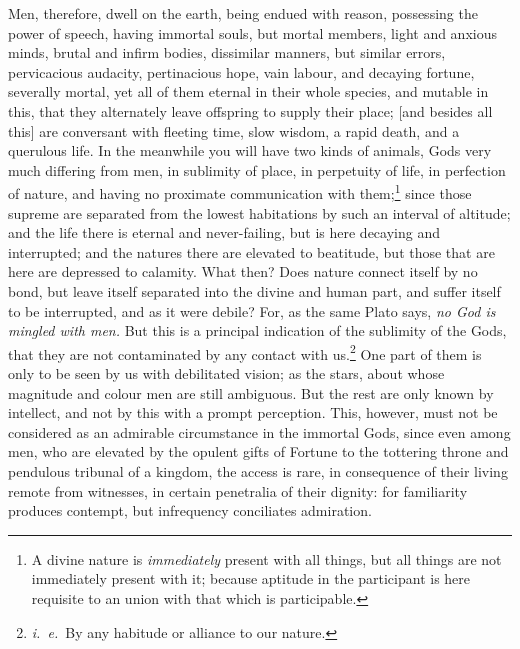 \documentclass[12pt]{article}
\begin{document}
Men, therefore, dwell on the earth, being endued with reason, possessing the
power of speech, having immortal souls, but mortal members, light and anxious
minds, brutal and infirm bodies, dissimilar manners, but similar errors,
pervicacious audacity, pertinacious hope, vain labour, and decaying fortune,
severally mortal, yet all of them eternal in their whole species, and mutable
in this, that they alternately leave offspring to supply their place; [and
besides all this] are conversant with fleeting time, slow wisdom, a rapid
death, and a querulous life. In the meanwhile you will have two kinds of
animals, Gods very much differing from men, in sublimity of place, in
perpetuity of life, in perfection of nature, and having no proximate
communication with them;\footnote{A divine nature is \textit{immediately}
present with all things, but all things are not immediately present with it;
because aptitude in the participant is here requisite to an union with that
which is participable.} since those supreme are separated from the lowest
habitations by such an interval of altitude; and the life there is eternal and
never-failing, but is here decaying and interrupted; and the natures there are
elevated to beatitude, but those that are here are depressed to calamity. What
then? Does nature connect itself by no bond, but leave itself separated into
the divine and human part, and suffer itself to be interrupted, and as it were
debile? For, as the same Plato says, \textit{no God is mingled with men.} But
this is a principal indication of the sublimity of the Gods, that they are not
contaminated by any contact with us.\footnote{\textit{i.~e.}~By any habitude or
alliance to our nature.} One part of them is only to be seen by us with
debilitated vision; as the stars, about whose magnitude and colour men are
still ambiguous. But the rest are only known by intellect, and not by this with
a prompt perception. This, however, must not be considered as an admirable
circumstance in the immortal Gods, since even among men, who are elevated by
the opulent gifts of Fortune to the tottering throne and pendulous tribunal of
a kingdom, the access is rare, in consequence of their living remote from
witnesses, in certain penetralia of their dignity: for familiarity produces
contempt, but infrequency conciliates admiration.
\end{document}
